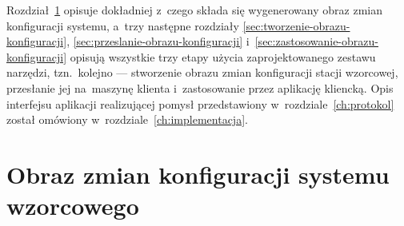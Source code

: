 \documentclass[thesis]{subfiles}
\begin{document}
Rozdział~\ref{sec:obraz-zmian-konfiguracji} opisuje dokładniej z~czego składa się wygenerowany obraz zmian konfiguracji systemu, a~trzy następne rozdziały \ref{sec:tworzenie-obrazu-konfiguracji}, \ref{sec:przeslanie-obrazu-konfiguracji} i~\ref{sec:zastosowanie-obrazu-konfiguracji} opisują wszystkie trzy etapy użycia zaprojektowanego zestawu narzędzi, tzn.~kolejno --- stworzenie obrazu zmian konfiguracji stacji wzorcowej, przesłanie jej na~maszynę klienta i~zastosowanie przez aplikację kliencką. Opis interfejsu aplikacji realizującej pomysł przedstawiony w~rozdziale~\ref{ch:protokol} został omówiony w~rozdziale~\ref{ch:implementacja}.


\section{Obraz zmian konfiguracji systemu wzorcowego}
\label{sec:obraz-zmian-konfiguracji}
\end{document}
